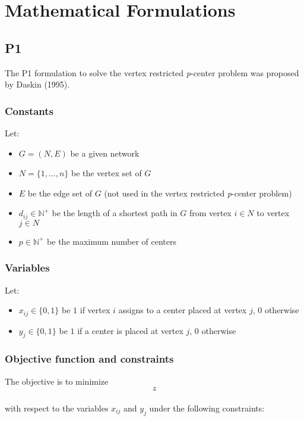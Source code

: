 \newpage
\chapter{Mathematical Formulations}
\section{P1}
The P1 formulation to solve the vertex restricted \textit{p}-center problem was proposed by Daskin (1995).
\subsection{Constants}
Let:
\begin{itemize}
	\item $G = \left( N, E\right)$ be a given network
	\item $N = \lbrace 1, ..., n\rbrace$ be the vertex set of $G$
	\item $E$ be the edge set of $G$ (not used in the vertex restricted \textit{p}-center problem)
	\item $d_{ij} \in \mathbb{N}^+$ be the length of a shortest path in $G$ from vertex $i \in N$ to vertex $j \in N$
	\item $p \in \mathbb{N}^+$ be the maximum number of centers
\end{itemize}
\subsection{Variables}
Let:
\begin{itemize}
	\item $x_{ij} \in \lbrace 0, 1\rbrace$ be $1$ if vertex $i$ assigns to a center placed at vertex $j$, $0$ otherwise
	\item $y_{j} \in \lbrace 0, 1\rbrace$ be $1$ if a center is placed at vertex $j$, $0$ otherwise
\end{itemize}
\subsection{Objective function and constraints}
The objective is to minimize\\ $$z$$\\ with respect to the variables $x_{ij}$ and $y_{j}$ under the following constraints:\\

